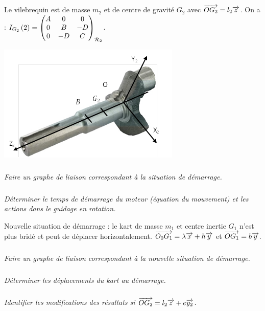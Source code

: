\documentclass[10pt,fleqn]{article} %
\begin{document}
\begin{multicols}{2}
Le vilebrequin est de masse $m_2$ et de centre de gravité $G_2$ avec $\vect{OG_2}=l_2\vect{z}$. On a : $\inertie{G_2}{2}=\matinertie{A}{B}{C}{-D}{0}{0}{\mathcal{R}_2}$.
\begin{center}
\includegraphics[width=\linewidth]{images/fig_02}
\end{center}

\subparagraph{}\textit{Faire un graphe de liaison correspondant à la situation de démarrage.}
\subparagraph{}\textit{Déterminer le temps de démarrage du moteur (équation du mouvement) et les actions dans le guidage en rotation.}

Nouvelle situation de démarrage : le kart de masse $m_1$ et centre inertie $G_1$ n’est plus bridé et peut de déplacer horizontalement. $\vect{O_0 G_1}=\lambda \vect{x}+h\vect{y}$ et $\vect{OG_1}=b\vect{y}$.

\subparagraph{}\textit{Faire un graphe de liaison correspondant à la nouvelle situation de démarrage.}
\subparagraph{}\textit{Déterminer les déplacements du kart au démarrage.}
\subparagraph{}\textit{Identifier les modifications des résultats si $\vect{OG_2}=l_2\vect{z}+e\vect{y_2}$.}


\end{multicols}
%
%
\end{document}
